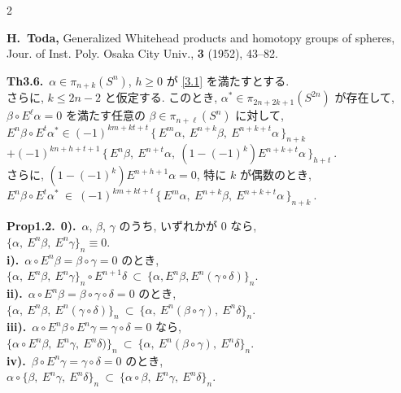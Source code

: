\documentclass[10pt, leqno]{ltjsarticle}
\newcommand{\Ex}{E}        %
\newcommand{\todai}[2][]{\{\,#2\,\}_{#1}}      %
\newcommand{\pis}[2]{\pi_{#1}(#2)}       %
\numberwithin{equation}{section}
\theoremstyle{plain}
\theoremstyle{definition}
\theoremstyle{remark}
\begin{document}
\begin{paracol}{2}
\switchcolumn

\noindent
\textbf{
\cite{Toda1952}
H.~Toda,}
\newblock Generalized Whitehead products and homotopy groups of spheres,
\newblock Jour. of Inst. Poly. Osaka City Univ., {\bf 3} (1952), 43--82.

\noindent
\textbf{Th3.6.}\
$\alpha\in\pis{n+k}{S^{n}}$, $h\ge0$ が \eqref{3.1} を満たすとする.\\ 
さらに, $k\le 2n-2$ と仮定する.
このとき,
\(\alpha^{*}\in\pis{2n+2k+1}{S^{2n}}\)
が存在して, \\
\(\beta\circ \Ex^{\ell}\alpha=0\)
を満たす任意の $\beta\in\pis{n+\ell}{S^{n}}$ に対して, \\
\(\Ex^{n}\beta \circ \Ex^{t}\alpha^{*}
\in (-1)^{km+kt+t}\,\todai[n+k]{\Ex^{m}\alpha,\ 
  \Ex^{n+k}\beta,\ \Ex^{n+k+t}\alpha}\)\\
\(+ (-1)^{kn+h+t+1}\,\todai[h+t]{\Ex^{n}\beta,\ 
  \Ex^{n+t}\alpha,\ (1-(-1)^k)\Ex^{n+k+t}\alpha}\ .\)\\
さらに,
\((1-(-1)^k)\Ex^{n+h+1}\alpha=0\), 特に \(k\) が偶数のとき, \\
\(
\Ex^{n}\beta\circ \Ex^{t}\alpha^{*}\ \in\
(-1)^{km+kt+t}\,\todai[n+k]{\Ex^{m}\alpha,\ \Ex^{n+k}\beta,\ \Ex^{n+k+t}\alpha}\ .
\)

\noindent
\textbf{Prop1.2.}\
\textbf{0).}\ $\alpha$, $\beta$, $\gamma$ のうち, いずれかが $0$ なら,\\
\(
\{\alpha,\ \Ex^n\beta,\ \Ex^n\gamma\}_n\equiv0.
\)\\
\textbf{i).}\ $\alpha\circ \Ex^n\beta=\beta\circ\gamma=0$ のとき,\\
\(
\{\alpha,\ \Ex^n\beta,\ \Ex^n\gamma\}_n\circ\Ex^{n+1}\delta\ \subset\ \{\alpha,\Ex^n \beta, \Ex^n(\gamma\circ\delta)\}_n.
\)\\
\textbf{ii).}\ $\alpha\circ \Ex^n\beta=\beta\circ\gamma\circ\delta=0$ のとき,\\
\(
\{\alpha,\ \Ex^n\beta,\ \Ex^n(\gamma\circ\delta)\}_n\ \subset\ \{\alpha,\ \Ex^n(\beta\circ\gamma),\ \Ex^n\delta\}_n .
\)\\
\textbf{iii).}\ $\alpha\circ\Ex^n\beta\circ\Ex^n\gamma=\gamma\circ\delta=0$ なら,\\
\(
\{\alpha\circ\Ex^n\beta,\ \Ex^n\gamma,\ \Ex^n\delta)\}_n\ \subset\ \{\alpha,\ \Ex^n(\beta\circ\gamma),\ \Ex^n\delta\}_n .
\)\\
\textbf{iv).}\ $\beta\circ\Ex^n\gamma=\gamma\circ\delta=0$ のとき,\\
\(
\alpha\circ\{\beta,\ \Ex^n\gamma,\ \Ex^n\delta\}_n\ \subset\ \{\alpha\circ\beta,\ \Ex^n\gamma,\ \Ex^n\delta\}_n .
\)



\end{paracol}
\end{document}
